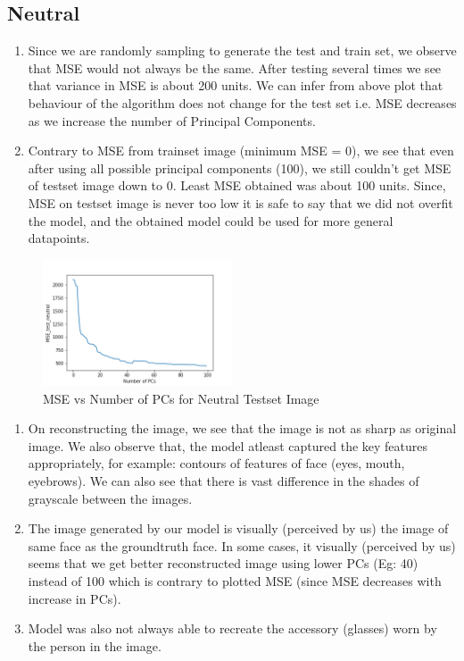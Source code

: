 \documentclass[11pt,letterpaper]{article}
\begin{document}
\subsection*{Neutral}
\begin{enumerate}
    [label=$\bullet$]
    \item Since we are randomly sampling to generate the test and train set, we observe that MSE would not always be the same. After testing several times we see that variance in MSE is about 200 units. We can infer from above plot that behaviour of the algorithm does not change for the test set i.e. MSE decreases as we increase the number of Principal Components.
    \item Contrary to MSE from trainset image (minimum MSE = 0), we see that even after using all possible principal components (100), we still couldn't get MSE of testset image down to 0. Least MSE obtained was about 100 units. Since, MSE on testset image is never too low it is safe to say that we did not overfit the model, and the obtained model could be used for more general datapoints.
\end{enumerate}
\begin{figure}[htbp]
    \centering
    \includegraphics*[width=0.5\textwidth]{../outputs/ans4/MSE_test_neutral.png}
    \caption{MSE vs Number of PCs for Neutral Testset Image}
    \end{figure}
\begin{enumerate}
    [label=$\bullet$]
    \item On reconstructing the image, we see that the image is not as sharp as original image. We also observe that, the model atleast captured the key features appropriately, for example: contours of features of face (eyes, mouth, eyebrows). We can also see that there is vast difference in the shades of grayscale between the images.
    \item The image generated by our model is visually (perceived by us) the image of same face as the groundtruth face. In some cases, it visually (perceived by us) seems that we get better reconstructed image using lower PCs (Eg: 40) instead of 100 which is contrary to plotted MSE (since MSE decreases with increase in PCs).
    \item Model was also not always able to recreate the accessory (glasses) worn by the person in the image.
\end{enumerate}
\end{document}
